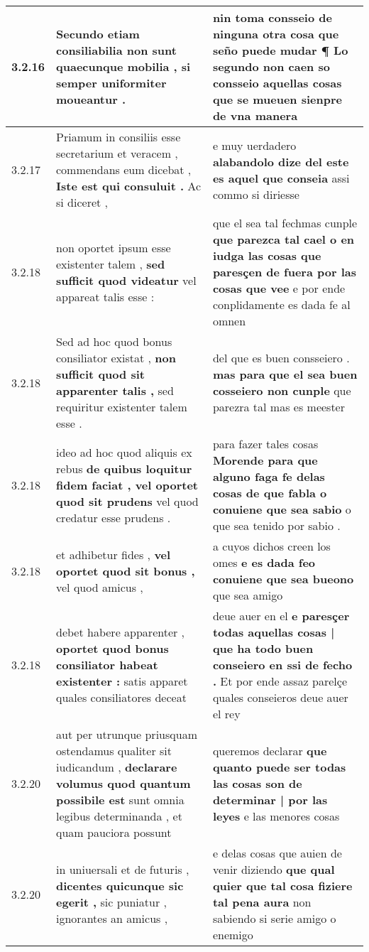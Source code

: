 \begin{tabular}{|p{1cm}|p{6.5cm}|p{6.5cm}|}
3.2.16 & Secundo etiam consiliabilia \textbf{ non sunt quaecunque mobilia , } si semper uniformiter moueantur . & nin toma consseio de ninguna otra cosa que seño puede mudar ¶ \textbf{ Lo segundo non caen so consseio aquellas cosas } que se mueuen sienpre de vna manera \\\hline
3.2.17 & Priamum in consiliis esse secretarium et veracem , commendans eum dicebat , \textbf{ Iste est qui consuluit . } Ac si diceret , & e muy uerdadero \textbf{ alabandolo dize del este es aquel que conseia } assi commo si diriesse \\\hline
3.2.18 & non oportet ipsum esse existenter talem , \textbf{ sed sufficit quod videatur } vel appareat talis esse : & que el sea tal fechmas cunple \textbf{ que parezca tal cael o en iudga las cosas que paresçen de fuera por las cosas que vee } e por ende conplidamente es dada fe al omnen \\\hline
3.2.18 & Sed ad hoc quod bonus consiliator existat , \textbf{ non sufficit quod sit apparenter talis , } sed requiritur existenter talem esse . & del que es buen consseiero . \textbf{ mas para que el sea buen cosseiero non cunple } que parezra tal mas es meester \\\hline
3.2.18 & ideo ad hoc quod aliquis ex rebus \textbf{ de quibus loquitur fidem faciat , vel oportet quod sit prudens } vel quod credatur esse prudens . & para fazer tales cosas \textbf{ Morende para que alguno faga fe delas cosas de que fabla o conuiene que sea sabio } o que sea tenido por sabio . \\\hline
3.2.18 & et adhibetur fides , \textbf{ vel oportet quod sit bonus , } vel quod amicus , & a cuyos dichos creen los omes \textbf{ e es dada feo conuiene que sea bueono } que sea amigo \\\hline
3.2.18 & debet habere apparenter , \textbf{ oportet quod bonus consiliator habeat existenter : } satis apparet quales consiliatores deceat & deue auer en el \textbf{ e paresçer todas aquellas cosas | que ha todo buen conseiero en ssi de fecho . } Et por ende assaz parelçe quales conseieros deue auer el rey \\\hline
3.2.20 & aut per utrunque priusquam ostendamus qualiter sit iudicandum , \textbf{ declarare volumus quod quantum possibile est } sunt omnia legibus determinanda , et quam pauciora possunt & queremos declarar \textbf{ que quanto puede ser todas las cosas son de determinar | por las leyes } e las menores cosas \\\hline
3.2.20 & in uniuersali et de futuris , \textbf{ dicentes quicunque sic egerit , } sic puniatur , ignorantes an amicus , & e delas cosas que auien de venir diziendo \textbf{ que qual quier que tal cosa fiziere tal pena aura } non sabiendo si serie amigo o enemigo \\\hline

\end{tabular}
